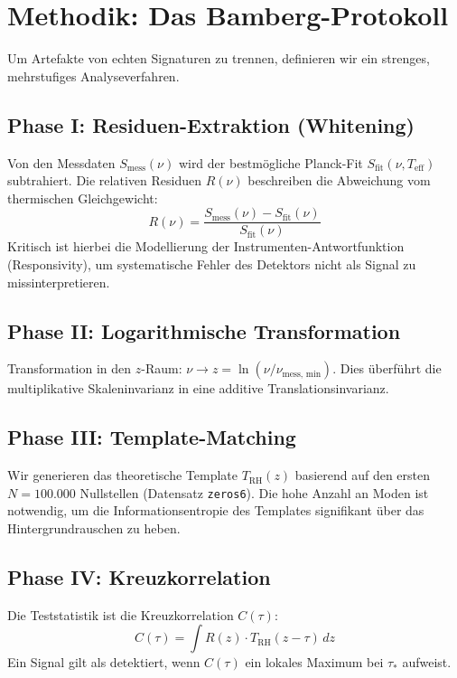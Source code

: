 \documentclass[11pt, a4paper]{article}
\begin{document}
	\section{Methodik: Das Bamberg-Protokoll}
	
	Um Artefakte von echten Signaturen zu trennen, definieren wir ein strenges, mehrstufiges Analyseverfahren.
	
	\subsection{Phase I: Residuen-Extraktion (Whitening)}
	Von den Messdaten $S_{\text{mess}}(\nu)$ wird der bestmögliche Planck-Fit $S_{\text{fit}}(\nu, T_{\text{eff}})$ subtrahiert. Die relativen Residuen $R(\nu)$ beschreiben die Abweichung vom thermischen Gleichgewicht:
	\begin{equation}
		R(\nu) = \frac{S_{\text{mess}}(\nu) - S_{\text{fit}}(\nu)}{S_{\text{fit}}(\nu)}
	\end{equation}
	Kritisch ist hierbei die Modellierung der Instrumenten-Antwortfunktion (Responsivity), um systematische Fehler des Detektors nicht als Signal zu missinterpretieren.
	
	\subsection{Phase II: Logarithmische Transformation}
	Transformation in den $z$-Raum: $\nu \to z = \ln(\nu/\nu_{\text{mess, min}})$. Dies überführt die multiplikative Skaleninvarianz in eine additive Translationsinvarianz.
	
	\subsection{Phase III: Template-Matching}
	Wir generieren das theoretische Template $T_{\text{RH}}(z)$ basierend auf den ersten $N=100.000$ Nullstellen (Datensatz \texttt{zeros6}). Die hohe Anzahl an Moden ist notwendig, um die Informationsentropie des Templates signifikant über das Hintergrundrauschen zu heben.
	
	\subsection{Phase IV: Kreuzkorrelation}
	Die Teststatistik ist die Kreuzkorrelation $C(\tau)$:
	\begin{equation}
		C(\tau) = \int R(z) \cdot T_{\text{RH}}(z-\tau) \, dz
	\end{equation}
	Ein Signal gilt als detektiert, wenn $C(\tau)$ ein lokales Maximum bei $\tau_*$ aufweist.
	
\end{document}
